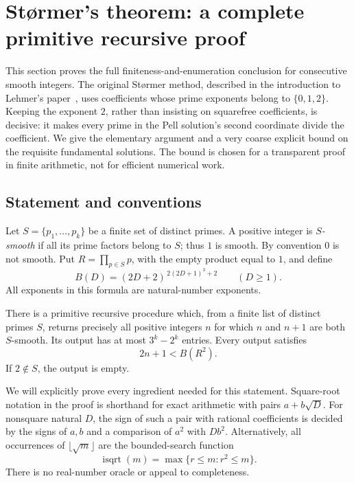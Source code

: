 \section{St\o rmer's theorem: a complete primitive recursive proof}
\label{sec:stormer}

This section proves the full finiteness-and-enumeration conclusion for consecutive
smooth integers.  The original St\o rmer method, described in the introduction to
Lehmer's paper~\cite{Lehmer1964}, uses coefficients whose prime exponents belong to
$\{0,1,2\}$.  Keeping the exponent $2$, rather than insisting on squarefree
coefficients, is decisive: it makes every prime in the Pell solution's second
coordinate divide the coefficient.  We give the elementary argument and a very
coarse explicit bound on the requisite fundamental solutions.  The bound is chosen
for a transparent proof in finite arithmetic, not for efficient numerical work.

\subsection{Statement and conventions}

Let $S=\{p_1,\ldots,p_k\}$ be a finite set of distinct primes.  A positive integer
is \emph{$S$-smooth} if all its prime factors belong to $S$; thus $1$ is smooth.
By convention $0$ is not smooth.
Put $R=\prod_{p\in S}p$, with the empty product equal to $1$, and define
\begin{equation}\label{eq:stormer-B}
 B(D)=(2D+2)^{\,2(2D+1)^3+2}\qquad(D\ge1).
\end{equation}
All exponents in this formula are natural-number exponents.

\begin{theorem}
\label{thm:stormer-pr}
There is a primitive recursive procedure which, from a finite list of distinct
primes $S$, returns precisely all positive integers $n$ for which $n$ and $n+1$
are both $S$-smooth.  Its output has at most $3^k-2^k$ entries.  Every output
satisfies
\[
             2n+1<B(R^2).
\]
If $2\notin S$, the output is empty.
\end{theorem}

We will explicitly prove every ingredient needed for this statement.  Square-root
notation in the proof is shorthand for exact arithmetic with pairs
$a+b\sqrt D$.  For nonsquare natural $D$, the sign of such a pair with rational
coefficients is decided by the signs of $a,b$ and a comparison of $a^2$ with
$Db^2$.  Alternatively, all occurrences of $\lfloor\sqrt m\rfloor$ are the
bounded-search function
\[
 \operatorname{isqrt}(m)=\max\{r\le m:r^2\le m\}.
\]
There is no real-number oracle or appeal to completeness.

